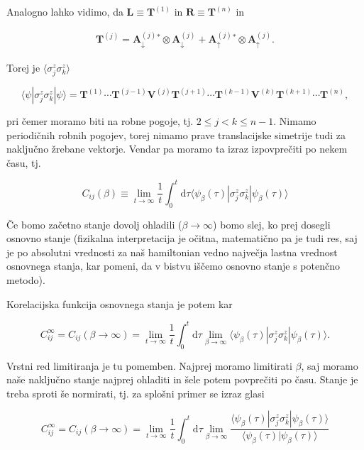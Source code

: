 \documentclass[12pt, a4 paper]{article}
\renewcommand{\d}{
	\ensuremath{\mathrm{d}}
}
\begin{document}
Analogno lahko vidimo, da $\mathbf{L} \equiv \mathbf{T}^{(1)}$ in $\mathbf{R} \equiv \mathbf{T}^{(n)}$ in

\begin{align}
	\mathbf{T}^{(j)} = \mathbf{A}^{(j)}_\downarrow{}^* \otimes \mathbf{A}^{(j)}_\downarrow +
		\mathbf{A}^{(j)}_\uparrow{}^* \otimes \mathbf{A}^{(j)}_\uparrow .
\end{align}

Torej je $\langle \sigma^z_j \sigma^z_k \rangle$

\[
	\langle \psi |\sigma^z_j \sigma^z_k | \psi\rangle = \mathbf{T}^{(1)} \cdots \mathbf{T}^{(j-1)} \mathbf{V}^{(j)}
		\mathbf{T}^{(j+1)} \cdots \mathbf{T}^{(k-1)} \mathbf{V}^{(k)} \mathbf{T}^{(k+1)}\cdots \mathbf{T}^{(n)},
\]

pri \v cemer moramo biti na robne pogoje, tj. $2 \leq j < k \leq n-1$. Nimamo periodi\v cnih robnih pogojev, torej nimamo
prave translacijske simetrije tudi za naklju\v cno \v zrebane vektorje. Vendar pa moramo ta izraz izpovpre\v citi po
nekem \v casu, tj.

\[
	C_{ij}(\beta) \equiv \lim_{t \to \infty} \frac{1}{t}\int_0^t \d \tau \langle \psi_\beta(\tau)|\sigma_j^z\sigma_k^z
		|\psi_\beta(\tau)\rangle
\]

\v Ce bomo za\v cetno stanje dovolj ohladili ($\beta \to \infty$) bomo slej, ko prej dosegli osnovno stanje (fizikalna
interpretacija je o\v citna, matemati\v cno pa je tudi res, saj je po absolutni vrednosti za na\v s hamiltonian vedno
najve\v cja lastna vrednost osnovnega stanja, kar pomeni, da v bistvu i\v s\v cemo osnovno stanje s poten\v cno metodo).

Korelacijska funkcija osnovnega stanja je potem kar

\[
	C_{ij}^\infty = C_{ij}(\beta \to \infty) = \lim_{t \to \infty} \frac{1}{t} \int_0^t \d\tau \lim_{\beta \to \infty}
		\langle\psi_\beta(\tau)|\sigma_j^z\sigma_k^z|\psi_\beta(\tau)\rangle.
\]

Vrstni red limitiranja je tu pomemben. Najprej moramo limitirati $\beta$, saj moramo na\v se naklju\v cno stanje najprej
ohladiti in \v sele potem povpre\v citi po \v casu. Stanje je treba sproti \v se normirati, tj. za splo\v sni primer se izraz
glasi

\begin{equation}
	C_{ij}^\infty = C_{ij}(\beta \to \infty) = \lim_{t \to \infty}\frac{1}{t}\int_0^t \d\tau \lim_{\beta \to \infty}
		\frac{\langle\psi_\beta(\tau)|\sigma^z_j\sigma^z_k|\psi_\beta(\tau)\rangle}
		{\langle\psi_\beta(\tau)|\psi_\beta(\tau)\rangle}
\end{equation}
\end{document}
